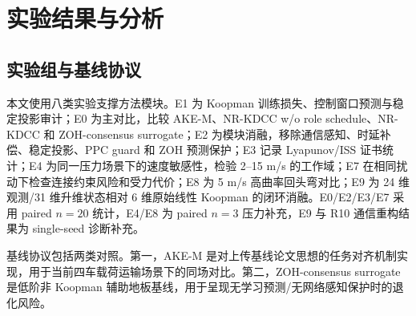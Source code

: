 \documentclass[twocolumn,3p,times,procedia]{elsarticle}
\newif\ifNRReview
\newcommand{\reviewblock}[1]{\ifNRReview\par\smallskip\noindent\begingroup\setlength{\fboxsep}{4pt}\colorbox{yellow!35}{\parbox{0.96\linewidth}{\footnotesize\textbf{当前不足：} #1}}\endgroup\par\smallskip\fi}
\newcommand{\AKE}{AKE-M}
\newcommand{\Method}{NR-KDCC}
\begin{document}
\reviewblock{E3 证书统计只能作为证书裕度和 ok ratio 的闭环证据，不能替代理论证明，也不能推出所有场景全局渐近稳定。旧版全场景聚合统计中 nominal 和 single-fault 出现负最小裕度；本轮分模式压力场景证据显示 high-communication-noise 与 mixed fault/noise 中 nominal/FTC 模式均为正裕度。因此稳定性 claim 应限定为有界工作域内的 ISS/UUB 实践有界。}

\section{实验结果与分析}

\subsection{实验组与基线协议}

本文使用八类实验支撑方法模块。E1 为 Koopman 训练损失、控制窗口预测与稳定投影审计；E0 为主对比，比较 \AKE{}、\Method{} w/o role schedule、\Method{} 和 ZOH-consensus surrogate；E2 为模块消融，移除通信感知、时延补偿、稳定投影、PPC guard 和 ZOH 预测保护；E3 记录 Lyapunov/ISS 证书统计；E4 为同一压力场景下的速度敏感性，检验 2--15 m/s 的工作域；E7 在相同扰动下检查连接约束风险和受力代价；E8 为 5 m/s 高曲率回头弯对比；E9 为 24 维观测/31 维升维状态相对 6 维原始线性 Koopman 的闭环消融。E0/E2/E3/E7 采用 paired $n=20$ 统计，E4/E8 为 paired $n=3$ 压力补充，E9 与 R10 通信重构结果为 single-seed 诊断补充。
\reviewblock{FDI/FTC 和 phase-role 尚未形成完全独立的多 seed 消融；R10 与 E9 是 single-seed 诊断补充，不能与 paired $n=20$ 主结果同等强度使用。Koopman 模块目前支撑控制窗口内闭环收益和短窗口预测可比，不支撑远期开环 rollout 全面优势。}

基线协议包括两类对照。第一，\AKE{} 是对上传基线论文思想的任务对齐机制实现，用于当前四车载荷运输场景下的同场对比。第二，ZOH-consensus surrogate 是低阶非 Koopman 辅助地板基线，用于呈现无学习预测/无网络感知保护时的退化风险。
\reviewblock{\AKE{} 机制基线尚未等同于上传原文 AKE-A 的完整复现；ZOH-consensus surrogate 也不能替代强物理 DMPC 或鲁棒控制基线。}
\end{document}
